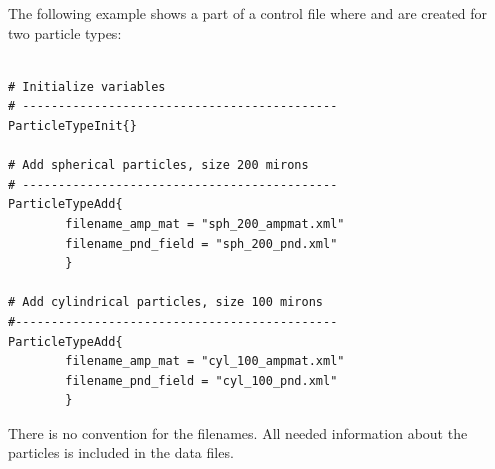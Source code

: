 The following example shows a part of a control file where
 and   are created
for two particle types:

\begin{verbatim}

# Initialize variables
# --------------------------------------------
ParticleTypeInit{}

# Add spherical particles, size 200 mirons
# --------------------------------------------
ParticleTypeAdd{
        filename_amp_mat = "sph_200_ampmat.xml" 
        filename_pnd_field = "sph_200_pnd.xml"
        }       

# Add cylindrical particles, size 100 mirons
#---------------------------------------------
ParticleTypeAdd{
        filename_amp_mat = "cyl_100_ampmat.xml" 
        filename_pnd_field = "cyl_100_pnd.xml"
        }   

\end{verbatim}
 
There is no convention for the filenames. All needed information about the particles is included in the data files.


\label{sec:scattering:rt_cloudbox}


